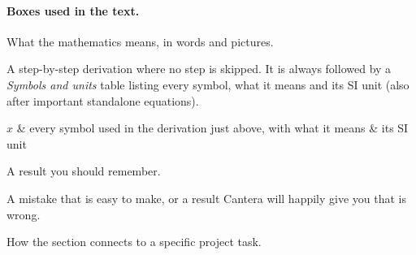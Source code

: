 \paragraph{Boxes used in the text.}
\begin{intuition}
What the mathematics means, in words and pictures.
\end{intuition}
\begin{derivation}
A step-by-step derivation where no step is skipped. It is always followed by a \emph{Symbols and units} table listing every symbol, what it means and its SI unit (also after important standalone equations).
\end{derivation}
\begin{symbols}
$x$ & every symbol used in the derivation just above, with what it means & its SI unit\\
\end{symbols}
\begin{keypoint}
A result you should remember.
\end{keypoint}
\begin{warning}
A mistake that is easy to make, or a result Cantera will happily give you that is wrong.
\end{warning}
\begin{project}
How the section connects to a specific project task.
\end{project}
